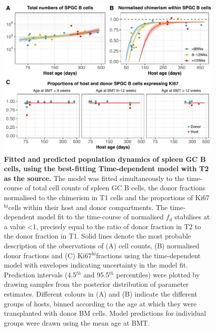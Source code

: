 \documentclass[11pt]{article}
\newcommand{\khi}{Ki67$^\text{hi}$}
\begin{document}
	\begin{figure}[h!]
		\centerline{\includegraphics[scale = 0.85] {Results_SPGC_T2.pdf}}
		\caption{\small \textbf{Fitted and predicted population dynamics of spleen GC B cells, using the best-fitting Time-dependent model with T2 as the source.}  The model was fitted simultaneously to the time-course of total cell counts of spleen GC B cells, the donor fractions normalised to the chimerism in T1 cells and the proportions of \khi cells within their host and donor compartments. The time-dependent model fit to the time-course of normalised $f_{d}$ stabilises at a value <1, precisely equal to the ratio of donor fraction in T2 to the donor fraction in T1. Solid lines denote the most probable description of the observations of (A) cell counts, (B) normalised donor fractions and (C) \khi fractions using the time-dependent model with envelopes indicating uncertainty in the model fit. Prediction intervals (4.5$^{th}$ and 95.5$^{th}$ percentiles) were plotted by drawing samples from the posterior distribution of parameter estimates. Different colours in (A) and (B) indicate the different groups of hosts, binned according to the age at which they were transplanted with donor BM cells. Model predictions for individual groups were drawn using the mean age at BMT.}
		\label{fig:results_SPGC}
	\end{figure}
    
\end{document}
